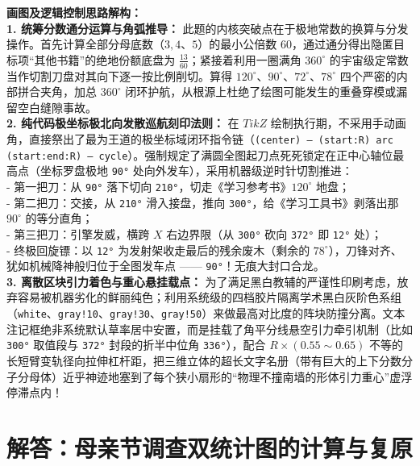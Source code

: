 \vspace{0.4cm}
{\small\color{blue!70!black}
\textbf{画图及逻辑控制思路解构：}\\
\textbf{1. 统筹分数通分运算与角弧推导：} 此题的内核突破点在于极地常数的换算与分发操作。首先计算全部分母底数（$3, 4$、$5$）的最小公倍数 60，通过通分得出隐匿目标项“其他书籍”的绝地份额底盘为 $\frac{13}{60}$；紧接着利用一圈满角 $360^\circ$ 的宇宙级定常数当作切割刀盘对其向下逐一按比例削切。算得 $120^\circ$、$90^\circ、72^\circ$、$78^\circ$ 四个严密的内部拼合夹角，加总 $360^\circ$ 闭环护航，从根源上杜绝了绘图可能发生的重叠穿模或漏留空白缝隙事故。\\
\textbf{2. 纯代码极坐标极北向发散巡航刻印法则：} 在 $TikZ$ 绘制执行期，不采用手动画角，直接祭出了最为王道的极坐标域闭环指令链（\texttt{(center) -- (start:R) arc (start:end:R) -- cycle}）。强制规定了满圆全图起刀点死死锁定在正中心轴位最高点（坐标罗盘极地 \texttt{90°} 处向外发车），采用机器级逆时针切割推进：\\
- 第一把刀：从 \texttt{90°} 落下切向 \texttt{210°}，切走《学习参考书》$120^\circ$ 地盘；\\
- 第二把刀：交接，从 \texttt{210°} 滑入接盘，推向 \texttt{300°}，给《学习工具书》剥落出那 $90^\circ$ 的等分直角；\\
- 第三把刀：引擎发威，横跨 $X$ 右边界限（从 \texttt{300°} 砍向 \texttt{372°} 即 \texttt{12°} 处）；\\
- 终极回旋镖：以 \texttt{12°} 为发射架收走最后的残余废木（剩余的 $78^\circ$），刀锋对齐、犹如机械降神般归位于全图发车点 —— \texttt{90°}！无痕大封口合龙。\\
\textbf{3. 离散区块引力着色与重心悬挂载点：} 为了满足黑白教辅的严谨性印刷考虑，放弃容易被机器劣化的鲜丽纯色；利用系统级的四档胶片隔离学术黑白灰阶色系组（\texttt{white}、\texttt{gray!10}、\texttt{gray!30}、\texttt{gray!50}）来做最高对比度的阵块防撞分离。文本注记框绝非系统默认草率居中安置，而是挂载了角平分线悬空引力牵引机制（比如 \texttt{300°} 取值段与 \texttt{372°} 封段的折半中位角 \texttt{336°}），配合 $R \times (0.55\sim 0.65)$ 不等的长短臂变轨径向拉伸杠杆距，把三维立体的超长文字名册（带有巨大的上下分数分子分母体）近乎神迹地塞到了每个狭小扇形的“物理不撞南墙的形体引力重心”虚浮停滞点内！
}

\newpage



\section{解答：母亲节调查双统计图的计算与复原}

